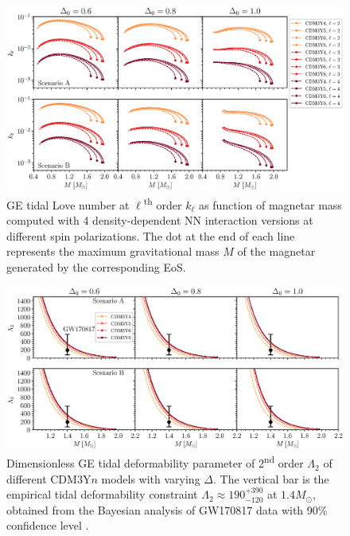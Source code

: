 \begin{figure}[ht!]
        \centering
        \includegraphics[width=\textwidth]{fig/kl.eps}
        \caption{\gls{GE} tidal Love number at $\ell$\textsuperscript{th} order $k_\ell$ as function of magnetar mass computed with 4 density-dependent \gls{NN} interaction versions at different spin polarizations. The dot at the end of each line represents the maximum gravitational mass $M$ of the magnetar generated by the corresponding \gls{EoS}.}
        \label{fig:kl}
\end{figure} 
\begin{figure}[ht!]
    \centering
    \includegraphics[width=\textwidth]{fig/Lambda2.eps}
    \caption{Dimensionless \gls{GE} tidal deformability parameter of 2\textsuperscript{nd} order $\Lambda_2$ of different CDM3Y$n$ models with varying $\Delta$. The vertical bar is the empirical tidal deformability constraint $\Lambda_2 \approx 190_{-120}^{+390}$ at $1.4M_\odot$, obtained from the Bayesian analysis of GW170817 data with 90\% confidence level \citep{abbott2018gw170817}.}
    \label{fig:Lambda2}
\end{figure} 
